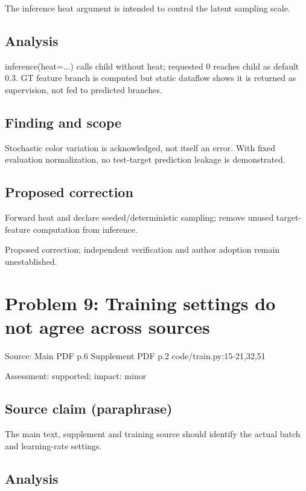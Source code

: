 \documentclass[11pt]{article}
\begin{document}
The inference heat argument is intended to control the latent sampling scale.

\subsection*{Analysis}

inference(heat=...) calls child without heat; requested \(0\) reaches child as default \(0.3\). GT feature branch is computed but static dataflow shows it is returned as supervision, not fed to predicted branches.

\subsection*{Finding and scope}

Stochastic color variation is acknowledged, not itself an error. With fixed evaluation normalization, no test-target prediction leakage is demonstrated.

\subsection*{Proposed correction}

Forward heat and declare seeded/deterministic sampling; remove unused target-feature computation from inference.

Proposed correction; independent verification and author adoption remain unestablished.

\section*{Problem 9: Training settings do not agree across sources}

Source: Main PDF p.6 Supplement PDF p.2 code/train.py:15-21,32,51

Assessment: supported; impact: minor

\subsection*{Source claim (paraphrase)}

The main text, supplement and training source should identify the actual batch and learning-rate settings.

\subsection*{Analysis}
\end{document}
